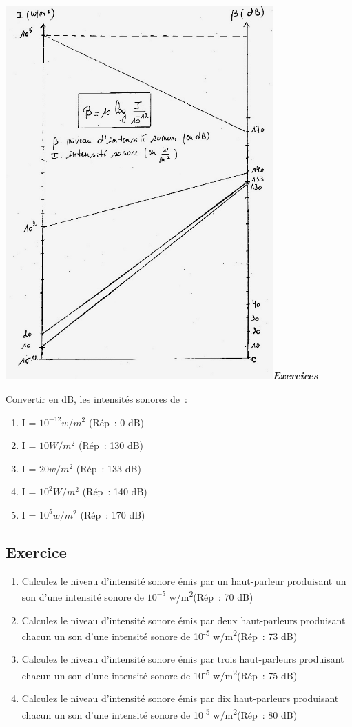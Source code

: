 \includegraphics[width=10.269cm,height=14.349cm]{Pictures/10000001000002480000033056ED2EA613E32604.png}\emph{\textbf{Exercices}}

Convertir en dB, les intensités sonores de~:

\begin{enumerate}
	\item I = $10^{-12} \si{w/m^2}$ (Rép~: 0 dB)
	\item I = $10 \si{ W/m^2 }$ (Rép~: 130 dB)
        \item I = $20 \si{w/m^2}$ (Rép~: 133 dB)
	\item I = $10^{2} \si{W/m^2}$ (Rép~: 140 dB)
	\item I = $10^5 \si{w/m^2}$ (Rép~: 170 dB)
\end{enumerate}

\subsection{Exercice}

\begin{enumerate}
\item Calculez le niveau d'intensité sonore émis par un haut-parleur
produisant un son d'une intensité sonore de $10^{-5}$ \si{w/m^2}(Rép~: 70 dB)
\item Calculez le niveau d'intensité sonore émis par deux haut-parleurs
produisant chacun un son d'une intensité sonore de
10\textsuperscript{-5} \si{w/m^2}(Rép~: 73 dB)
\item Calculez le niveau d'intensité sonore émis par trois haut-parleurs
produisant chacun un son d'une intensité sonore de
10\textsuperscript{-5} \si{w/m^2}(Rép~: 75 dB)
\item Calculez le niveau d'intensité sonore émis par dix haut-parleurs
produisant chacun un son d'une intensité sonore de
10\textsuperscript{-5} \si{w/m^2}(Rép~: 80 dB)
\end{enumerate}

